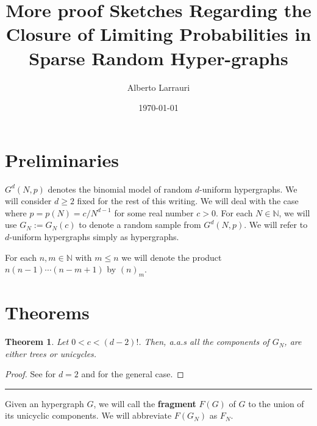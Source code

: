 \documentclass[11pt,notitlepage,a4paper]{article}
\title{More proof Sketches Regarding the Closure of 
	Limiting Probabilities in Sparse Random Hyper-graphs}
\date{\today}
\author{Alberto Larrauri}
\newtheorem{theorem}{Theorem}[section]
\theoremstyle{definition}
\newcommand{\N}{\mathbb{N}}
\begin{document}
	\maketitle 
\section*{Preliminaries}
$G^d(N,p)$ denotes the binomial model of random $d$-uniform hypergraphs. 
We will consider $d\geq 2$ fixed for the rest of this writing. 
We will deal with the case where $p=p(N)= c/N^{d-1}$ for some real number 
$c> 0$. For each $N\in \N$, we will use $G_N:=G_N(c)$ to denote a random sample from $G^d(N,p)$. We will refer to $d$-uniform hypergraphs simply as hypergraphs.

For each $n,m\in \N$ with $m\leq n$ we will
denote the product $n(n-1)\cdots (n-m+1)$ by 
$(n)_m$. 

\section*{Theorems}
\begin{theorem} \label{thm:subcritical}
Let $0<c<(d-2)!$. Then, a.a.s all the components
of $G_N$, are either trees or unicycles.
\end{theorem}
\begin{proof} See \cite{erdHos1960evolution} for $d=2$ and
	\cite{karonski2002phase} for the general case.
\end{proof}
\noindent\rule{2cm}{0.4pt}\par
Given an hypergraph $G$, we will call the \textbf{fragment} $F(G)$
of $G$ to the union of its unicyclic components. We will abbreviate
$F(G_N)$ as $F_N$.
\end{document}
